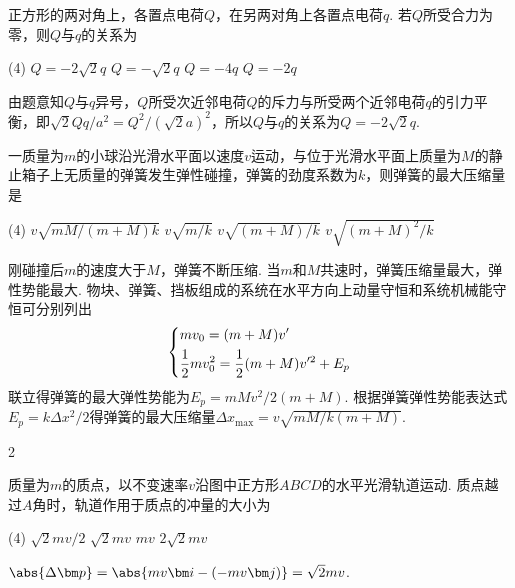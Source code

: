 \begin{problem}
    正方形的两对角上，各置点电荷$Q$，在另两对角上各置点电荷$q$. 若$Q$所受合力为零，则$Q$与$q$的关系为
    \begin{tasks}(4)
        \task[\true] $Q=-2\sqrt2q$
        \task $Q=-\sqrt2q$
        \task $Q=-4q$
        \task $Q=-2q$
    \end{tasks}
\end{problem}
\begin{solution}
    由题意知$Q$与$q$异号，$Q$所受次近邻电荷$Q$的斥力与所受两个近邻电荷$q$的引力平衡，即$\sqrt2Qq/a^2=Q^2/(\sqrt2a)^2$，所以$Q$与$q$的关系为$Q=-2\sqrt2q$.
\end{solution}

\begin{problem}
    一质量为$m$的小球沿光滑水平面以速度$v$运动，与位于光滑水平面上质量为$M$的静止箱子上无质量的弹簧发生弹性碰撞，弹簧的劲度系数为$k$，则弹簧的最大压缩量是
    \begin{tasks}(4)
        \task[\true] $v\sqrt{mM/(m+M)k}$
        \task $v\sqrt{m/k}$
        \task $v\sqrt{(m+M)/k}$
        \task $v\sqrt{(m+M)^2/k}$
    \end{tasks}
\end{problem}
\begin{solution}
    刚碰撞后$m$的速度大于$M$，弹簧不断压缩. 当$m$和$M$共速时，弹簧压缩量最大，弹性势能最大. 物块、弹簧、挡板组成的系统在水平方向上动量守恒和系统机械能守恒可分别列出
    \[\begin{dcases}
        mv_0=(m+M)v'\\
        \frac12mv_0^2=\frac12(m+M)v'^2+E_p
    \end{dcases}\]
    联立得弹簧的最大弹性势能为$E_p=mMv^2/2(m+M)$. 根据弹簧弹性势能表达式$E_p=k\Delta x^2/2$得弹簧的最大压缩量$\Delta x_{\max}=v\sqrt{mM/k(m+M)}$.
\end{solution}

\begin{paracol}{2}
\begin{problem}
    质量为$m$的质点，以不变速率$v$沿图中正方形$ABCD$的水平光滑轨道运动. 质点越过$A$角时，轨道作用于质点的冲量的大小为
    \begin{tasks}(4)
        \task $\sqrt2mv/2$
        \task[\true] $\sqrt2mv$
        \task $mv$
        \task $2\sqrt2mv$
    \end{tasks}
    \switchcolumn\vspace*{\fill}\centering
    \vspace*{\fill}
\end{problem}
\switchcolumn
\begin{solution}
    $\abs{\Delta\bm p}=\abs{mv\bm i-(-mv\bm j)}=\sqrt2mv$.
\end{solution}
\end{paracol}

